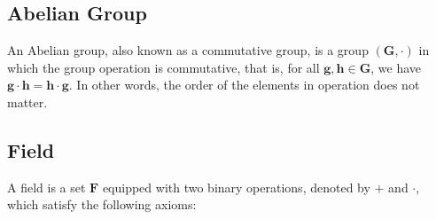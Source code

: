 \subsection{Abelian Group}
An Abelian group, also known as a commutative group, is a group $(\mathbf{G}, \cdot)$ in which the group operation is commutative, that is, for all $\mathbf{g,h} \in \mathbf{G}$, we have $\mathbf{g} \cdot \mathbf{h} = \mathbf{h} \cdot \mathbf{g}$. In other words, the order of the elements in operation does not matter.


\subsection{Field}
A field is a set $\mathbf{F}$ equipped with two binary operations, denoted by $+$ and $\cdot$, which satisfy the following axioms:

